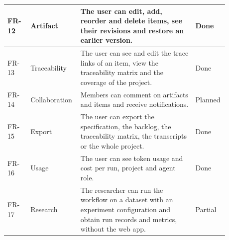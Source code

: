 \begin{longtable}{|p{0.1\linewidth}|p{0.17\linewidth}|p{0.5\linewidth}|p{0.11\linewidth}|}
    FR-12 & Artifact & The user can edit, add, reorder and delete items, see their revisions and restore an earlier version. & Done \\ \hline
    FR-13 & Traceability & The user can see and edit the trace links of an item, view the traceability matrix and the coverage of the project. & Done \\ \hline
    FR-14 & Collaboration & Members can comment on artifacts and items and receive notifications. & Planned \\ \hline
    FR-15 & Export & The user can export the specification, the backlog, the traceability matrix, the transcripts or the whole project. & Done \\ \hline
    FR-16 & Usage & The user can see token usage and cost per run, project and agent role. & Done \\ \hline
    FR-17 & Research & The researcher can run the workflow on a dataset with an experiment configuration and obtain run records and metrics, without the web app. & Partial \\ \hline
\end{longtable}
\endgroup
